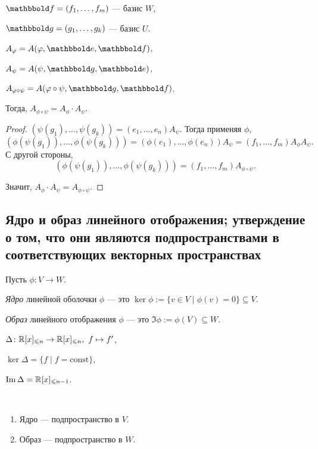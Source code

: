 $\F = (f_1, \dots, f_m)$ --- базис $W$,

$\G = (g_1, \dots, g_k)$ --- базис $U$.

$A_{\phi} = A(\phi, \E, \F)$,

$A_\psi = A(\psi, \G, \E)$,

$A_{\phi \circ \psi} = A(\phi \circ \psi, \G, \F)$.

Тогда, $A_{\phi \circ \psi} = A_\phi \cdot A_\psi$.

\begin{proof}
    $(\psi(g_1), \dots, \psi(g_k)) = (e_1, \dots, e_n) A_\psi$.
    Тогда применяя $\phi$,
    \begin{equation*}
        \left(\phi\left(\psi(g_1)\right), \dots, \phi\left(\psi(g_k)\right)\right) = \left(\phi(e_1), \dots, \phi(e_n)\right) A_\psi = (f_1, \dots, f_m) A_\phi A_\psi
    .\end{equation*}
    С другой стороны,
    \begin{equation*}
        \left(\phi\left(\psi(g_1)\right), \dots, \phi\left(\psi(g_k)\right)\right) = (f_1, \dots, f_m) A_{\phi \circ \psi}
    .\end{equation*}

    Значит, $A_\phi \cdot A_\psi = A_{\phi \circ \psi}$.
\end{proof}


\subsection{Ядро и образ линейного отображения; утверждение о том, что они являются подпространствами в соответствующих векторных пространствах}

Пусть $\phi \colon V \to W$.

\begin{definition}
    \textit{Ядро} линейной оболочки $\phi$ --- это $\ker \phi := \{v \in V \mid \phi(v) = 0\} \subseteq V$.

    \textit{Образ} линейного отображения $\phi$ --- это $\Im \phi := \phi(V) \subseteq W$.
\end{definition}

\begin{example}
    $\Delta \colon \mathbb{R}[x]_{\leqslant n} \to \mathbb{R}[x]_{\leqslant n}, \ f \mapsto f'$,

    $\ker \Delta = \{f \mid f = \text{const}\}$,

    $\operatorname{\mathop{\mathrm{Im}}} \Delta = \mathbb{R}[x]_{\leqslant n - 1}$.
\end{example}

\begin{proposal}~
    \begin{enumerate}
    \item Ядро --- подпространство в $V$.
    \item Образ --- подпространство в $W$.
    \end{enumerate}
\end{proposal}

